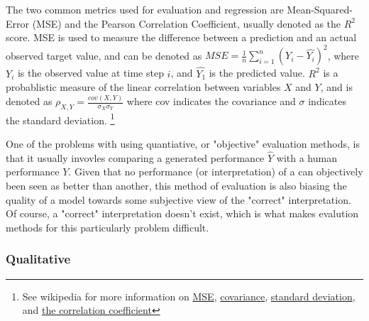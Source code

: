 The two common metrics used for evaluation and regression are Mean-Squared-Error (MSE) and the Pearson Correlation Coefficient, usually denoted as the $R^2$ score. MSE is used to measure the difference between a prediction and an actual observed target value, and can be denoted as $MSE = \frac{1}{n}\sum_{i=1}^{n}(Y_i - \hat{Y_i})^2$, where $Y_i$ is the observed value at time step $i$, and $\hat{Y_1}$ is the predicted value. $R^2$ is a probablistic measure of the linear correlation between variables $X$ and $Y$, and is denoted as $\rho_{X,Y} = \frac{cov(X,Y)}{\sigma_{X}\sigma_{Y}}$ where cov indicates the covariance and $\sigma$ indicates the standard deviation. \footnote{See wikipedia for more information on \href{https://en.wikipedia.org/wiki/Mean_squared_error}{MSE}, \href{https://en.wikipedia.org/wiki/Covariance}{covariance}, \href{https://en.wikipedia.org/wiki/Standard_deviation}{standard deviation}, and \href{https://en.wikipedia.org/wiki/Pearson_correlation_coefficient}{the correlation coefficient}}

One of the problems with using quantiative, or "objective" evaluation methods, is that it usually invovles comparing a generated performance $\hat{Y}$ with a human performance ${Y}$. Given that no performance (or interpretation) of a can objectively been seen as better than another, this method of evaluation is also biasing the quality of a model towards some subjective view of the "correct" interpretation. Of course, a "correct" interpretation doesn't exist, which is what makes evalution methods for this particularly problem difficult. 


\subsubsection{Qualitative}
